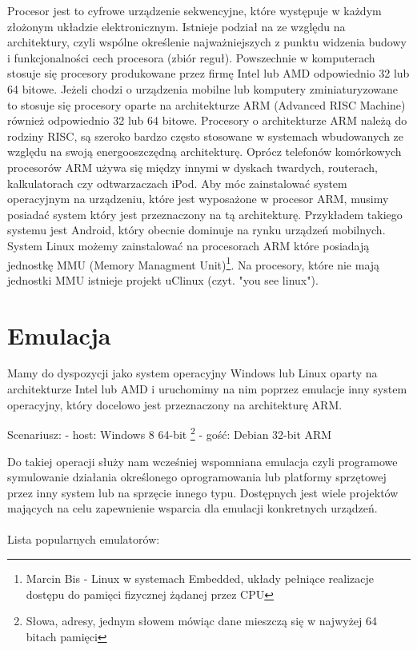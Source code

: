 Procesor jest to cyfrowe urządzenie sekwencyjne, które występuje w każdym złożonym układzie elektronicznym. Istnieje podział na ze względu na architektury, czyli wspólne określenie najważniejszych z punktu widzenia budowy i funkcjonalności cech procesora (zbiór reguł). Powszechnie w komputerach stosuje się procesory produkowane przez firmę Intel lub AMD odpowiednio 32 lub 64 bitowe. Jeżeli chodzi o urządzenia mobilne lub komputery zminiaturyzowane to stosuje się procesory oparte na architekturze ARM (Advanced RISC Machine) również odpowiednio 32 lub 64 bitowe. Procesory o architekturze ARM należą do rodziny RISC, są szeroko bardzo często stosowane w systemach wbudowanych ze względu na swoją energooszczędną architekturę. Oprócz telefonów komórkowych procesorów ARM używa się między innymi w dyskach twardych, routerach, kalkulatorach czy odtwarzaczach iPod. Aby móc zainstalować system operacyjnym na urządzeniu, które jest wyposażone w procesor ARM, musimy posiadać system który jest przeznaczony na tą architekturę. Przykładem takiego systemu jest Android, który obecnie dominuje na rynku urządzeń mobilnych. System Linux możemy zainstalować na procesorach ARM które posiadają jednostkę MMU (Memory Managment Unit)\footnote{Marcin Bis - Linux w systemach Embedded, układy pełniące realizacje dostępu do pamięci fizycznej żądanej przez CPU}. Na procesory, które nie mają jednostki MMU istnieje projekt uClinux (czyt. "you see linux").



\section{Emulacja}


Mamy do dyspozycji jako system operacyjny Windows lub Linux oparty na architekturze Intel lub AMD i uruchomimy na nim poprzez emulacje inny system operacyjny, który docelowo jest przeznaczony na architekturę ARM.

Scenariusz:\newline
- host: Windows 8 64-bit \footnote{Słowa, adresy, jednym słowem mówiąc dane mieszczą się w najwyżej 64 bitach pamięci} \newline
- gość: Debian 32-bit ARM

Do takiej operacji służy nam wcześniej wspomniana emulacja czyli programowe symulowanie działania określonego oprogramowania lub platformy sprzętowej przez inny system lub na sprzęcie innego typu. Dostępnych jest wiele projektów mających na celu zapewnienie wsparcia dla emulacji konkretnych urządzeń. 
\\
\\
Lista popularnych emulatorów:

